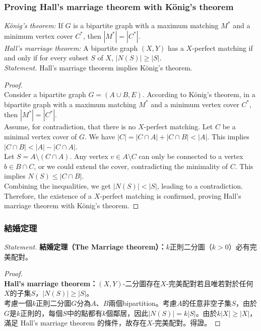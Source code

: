 \documentclass[a4paper,12pt]{report}
\begin{document}
\subsubsection{Proving Hall's marriage theorem with König's theorem}
\textit{König's theorem: }If \(G\) is a bipartite graph with a maximum matching \(M^*\) and a minimum vertex cover \(C^*\), then \(|M^*| = |C^*|\). \\
\textit{Hall's marriage theorem: }A bipartite graph \((X, Y)\) has a \(X\)-perfect matching if and only if for every subset \(S\) of \(X\), \(|N(S)| \geq |S|\). \\
\textit{Statement. }Hall's marriage theorem implies König's theorem.
\begin{proof}\mbox{}\\
Consider a bipartite graph \(G = (A \cup B, E)\). According to König's theorem, in a bipartite graph with a maximum matching \(M^*\) and a minimum vertex cover \(C^*\), then \(|M^*| = |C^*|\). \\
Assume, for contradiction, that there is no \(X\)-perfect matching. Let \(C\) be a minimal vertex cover of \(G\). We have \(|C| = |C \cap A| + |C \cap B| < |A|\). This implies \(|C \cap B| < |A| - |C \cap A|\). \\
Let \(S = A \setminus (C \cap A)\). Any vertex \(v \in A \setminus C\) can only be connected to a vertex \(b \in B \cap C\), or we could extend the cover, contradicting the minimality of \(C\). This implies \(N(S) \leq |C \cap B|\). \\
Combining the inequalities, we get \(|N(S)| < |S|\), leading to a contradiction. Therefore, the existence of a \(X\)-perfect matching is confirmed, proving Hall's marriage theorem with König's theorem.
\end{proof}
\subsubsection{結婚定理}
\textit{Statement. }\textbf{結婚定理（The Marriage theorem）：}$k$正則二分圖（$k>0$）必有完美配對。
\begin{proof}\mbox{}\\
\textbf{Hall's marriage theorem：}$(X, Y)$-二分圖存在$X$-完美配對若且唯若對於任何$X$的子集$S$，$|N(S)|\geq|S|$。 \\
考慮一個$k$正則二分圖$G$分為$A$、$B$兩個bipartition。考慮$A$的任意非空子集$S$，由於$G$是$k$正則的，每個$S$中的點都有$k$個鄰居，因此$|N(S)| = k|S|$。由於$k|X| \geq |X|$，滿足 Hall's marriage theorem 的條件，故存在$X$-完美配對。得證。
\end{proof}
\end{document}
